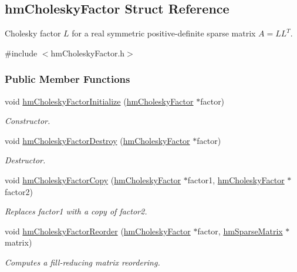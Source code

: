\hypertarget{structhm_cholesky_factor}{\subsection{hm\-Cholesky\-Factor Struct Reference}
\label{structhm_cholesky_factor}
}


Cholesky factor $L$ for a real symmetric positive-\/definite sparse matrix $A = LL^T$.  




{\ttfamily \#include $<$hm\-Cholesky\-Factor.\-h$>$}

\subsubsection*{Public Member Functions}
\begin{DoxyCompactItemize}
\item 
void \hyperlink{structhm_cholesky_factor_acff2cd111a95bb6d3682c0e346761ef4}{hm\-Cholesky\-Factor\-Initialize} (\hyperlink{structhm_cholesky_factor}{hm\-Cholesky\-Factor} $\ast$factor)
\begin{DoxyCompactList}\small\item\em Constructor. \end{DoxyCompactList}\item 
void \hyperlink{structhm_cholesky_factor_ae3c91c19927d39bb83009549a035e2be}{hm\-Cholesky\-Factor\-Destroy} (\hyperlink{structhm_cholesky_factor}{hm\-Cholesky\-Factor} $\ast$factor)
\begin{DoxyCompactList}\small\item\em Destructor. \end{DoxyCompactList}\item 
void \hyperlink{structhm_cholesky_factor_a24b6925adf8a5db40c21bcec0a0d44d5}{hm\-Cholesky\-Factor\-Copy} (\hyperlink{structhm_cholesky_factor}{hm\-Cholesky\-Factor} $\ast$factor1, \hyperlink{structhm_cholesky_factor}{hm\-Cholesky\-Factor} $\ast$factor2)
\begin{DoxyCompactList}\small\item\em Replaces factor1 with a copy of factor2. \end{DoxyCompactList}\item 
void \hyperlink{structhm_cholesky_factor_a753275af638618f3df7d7bece7b587be}{hm\-Cholesky\-Factor\-Reorder} (\hyperlink{structhm_cholesky_factor}{hm\-Cholesky\-Factor} $\ast$factor, \hyperlink{structhm_sparse_matrix}{hm\-Sparse\-Matrix} $\ast$matrix)
\begin{DoxyCompactList}\small\item\em Computes a fill-\/reducing matrix reordering. \end{DoxyCompactList}\item 

\end{DoxyCompactItemize}
